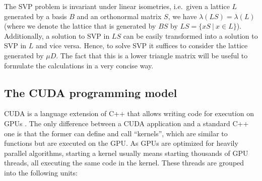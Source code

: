 \documentclass{scrartcl}
\begin{document}
    The SVP problem is invariant under linear isometries, i.e.\ given a lattice $L$ generated by a basis $B$ and an orthonormal matrix $S$, we have $\lambda(L S) = \lambda(L)$ 
    (where we denote the lattice that is generated by $B S$ by $L S = \{ x S \ | \ x \in L \}$). 
    Additionally, a solution to SVP in $L S$ can be easily transformed into a solution to SVP in $L$ and vice versa.
    Hence, to solve SVP it suffices to consider the lattice generated by $\mu D$.
    The fact that this is a lower triangle matrix will be useful to formulate the calculations in a very concise way.

    \subsection{The CUDA programming model}

    CUDA is a language extension of C++ that allows writing code for execution on GPUs \cite{cuda}. The only difference between a CUDA application and a standard C++ one is that the former can define and call ``kernels'', which are similar to functions but are executed on the GPU. As GPUs are optimized for heavily parallel algorithms, starting a kernel usually means starting thousands of GPU threads, all executing the same code in the kernel. These threads are grouped into the following units:
\end{document}
